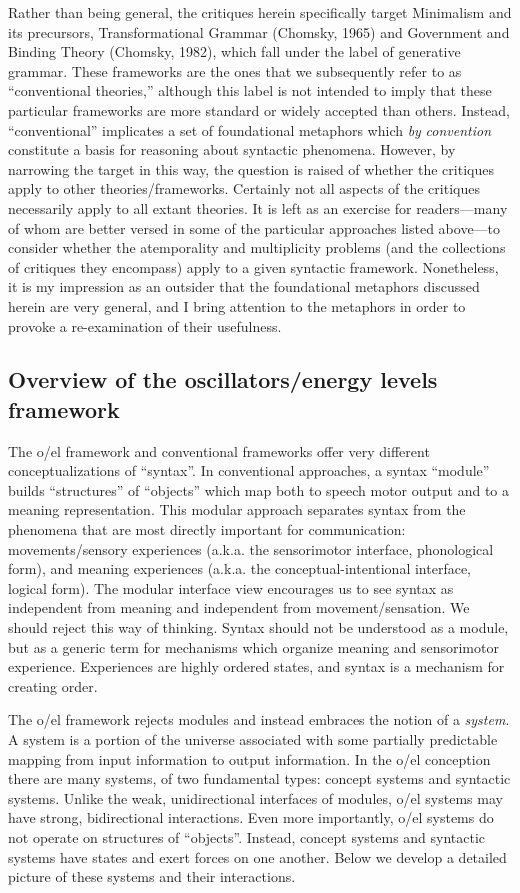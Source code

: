 Rather than being general, the critiques herein specifically target Minimalism and its precursors, Transformational Grammar (Chomsky, 1965) and Government and Binding Theory (Chomsky, 1982), which fall under the label of generative grammar. These frameworks are the ones that we subsequently refer to as “conventional theories,” although this label is not intended to imply that these particular frameworks are more standard or widely accepted than others. Instead, “conventional” implicates a set of foundational metaphors which \textit{by} \textit{convention} constitute a basis for reasoning about syntactic phenomena. However, by narrowing the target in this way, the question is raised of whether the critiques apply to other theories/frameworks. Certainly not all aspects of the critiques necessarily apply to all extant theories. It is left as an exercise for readers—many of whom are better versed in some of the particular approaches listed above—to consider whether the atemporality and multiplicity problems (and the collections of critiques they encompass) apply to a given syntactic framework. Nonetheless, it is my impression as an outsider that the foundational metaphors discussed herein are very general, and I bring attention to the metaphors in order to provoke a re-examination of their usefulness.

\subsection{Overview of the oscillators/energy levels framework}
The o/el framework and conventional frameworks offer very different conceptualizations of “syntax”. In conventional approaches, a syntax “module” builds “structures” of “objects” which map both to speech motor output and to a meaning representation. This modular approach separates syntax from the phenomena that are most directly important for communication: movements/sensory experiences (a.k.a. the sensorimotor interface, phonological form), and meaning experiences (a.k.a. the conceptual-intentional interface, logical form). The modular interface view encourages us to see syntax as independent from meaning and independent from movement/sensation. We should reject this way of thinking. Syntax should not be understood as a module, but as a generic term for mechanisms which organize meaning and sensorimotor experience. Experiences are highly ordered states, and syntax is a mechanism for creating order. 

  The o/el framework rejects modules and instead embraces the notion of a \textit{system}. A system is a portion of the universe associated with some partially predictable mapping from input information to output information. In the o/el conception there are many systems, of two fundamental types: concept systems and syntactic systems. Unlike the weak, unidirectional interfaces of modules, o/el systems may have strong, bidirectional interactions. Even more importantly, o/el systems do not operate on structures of “objects”. Instead, concept systems and syntactic systems have states and exert forces on one another. Below we develop a detailed picture of these systems and their interactions. 

